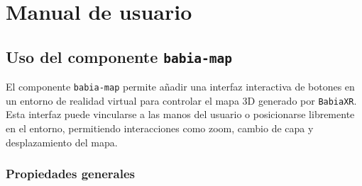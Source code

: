 \documentclass[a4paper, 12pt]{book}
\begin{document}

\cleardoublepage
\appendix
\chapter{Manual de usuario}
\label{app:manual}


\section{Uso del componente \texttt{babia-map}}

El componente \texttt{babia-map} permite añadir una interfaz interactiva de botones en un entorno de realidad virtual para controlar el mapa 3D generado por \texttt{BabiaXR}. Esta interfaz puede vincularse a las manos del usuario o posicionarse libremente en el entorno, permitiendo interacciones como zoom, cambio de capa y desplazamiento del mapa.

\subsection*{Propiedades generales}
\end{document}
